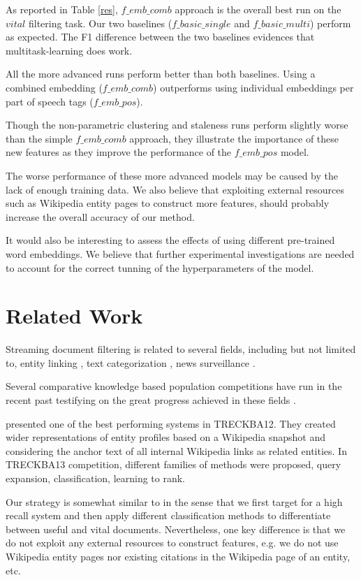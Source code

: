 \documentclass{article}
\begin{document}
As reported in Table \ref{res}, $f\_emb\_comb$ approach is the overall best run on the $vital$ filtering task. Our two baselines ($f\_basic\_single$ and $f\_basic\_multi$) perform as expected. The F1 difference between the two baselines evidences that multitask-learning does work.

All the more advanced runs perform better than both baselines. Using a combined embedding ($f\_emb\_comb$) outperforms using individual embeddings per part of speech tags ($f\_emb\_pos$).

Though the non-parametric clustering and staleness runs perform slightly worse than the simple $f\_emb\_comb$ approach, they illustrate the importance of these new features as they improve the performance of the $f\_emb\_pos$ model.

The worse performance of these more advanced models may be caused by the lack of enough training data. We also believe that exploiting external resources such as Wikipedia entity pages to construct more features, should probably increase the overall accuracy of our method.

It would also be interesting to assess the effects of using different pre-trained word embeddings. We believe that further experimental investigations are needed to account for the correct tunning of the hyperparameters of the model.

\section{Related Work}
\label{related}

Streaming document filtering is related to several fields, including but not limited to, entity linking \cite{KBP11}, text categorization \cite{HLTCOE12}, news surveillance \cite{Steinberger14}.

Several comparative knowledge based population competitions have run in the recent past testifying on the great progress achieved in these fields \cite{gross_doucet_toivonen_trec12}. 

\cite{xitong12} presented one of the best performing systems in TRECKBA12. They created wider representations of entity profiles based on a Wikipedia snapshot and considering the anchor text of all internal Wikipedia links as related entities. In TRECKBA13 competition, different families of methods were proposed, query expansion, classification, learning to rank. 

Our strategy is somewhat similar to \cite{jingang13} in the sense that we first target for a high recall system and then apply different classification methods to differentiate between useful and vital documents. Nevertheless, one key difference is that we do not exploit any external resources to construct features, e.g. we do not use Wikipedia entity pages nor existing citations in the Wikipedia page of an entity, etc. 
\end{document}

